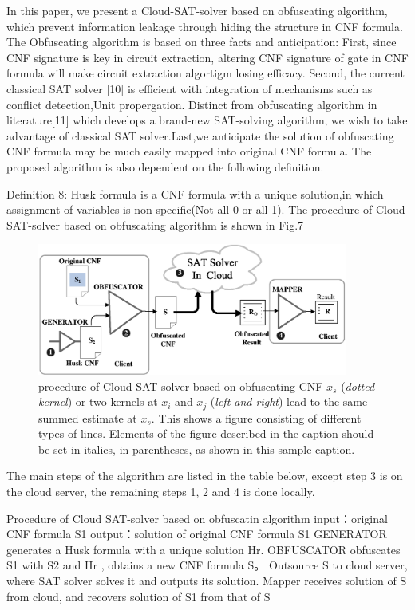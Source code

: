 \documentclass[runningheads,a4paper]{llncs}
\begin{document}
In this paper, we present a Cloud-SAT-solver based on obfuscating algorithm, which prevent information leakage through hiding the structure in CNF formula. The Obfuscating algorithm is based on three facts and anticipation: First, since CNF signature is key in circuit extraction, altering CNF signature of gate in CNF formula will make circuit extraction algortigm losing efficacy. Second, the current classical SAT solver [10] is efficient with integration of mechanisms such as conflict detection,Unit propergation. Distinct from obfuscating algorithm in literature[11] which develops a brand-new SAT-solving algorithm, we wish to take advantage of classical SAT solver.Last,we anticipate the solution of obfuscating CNF formula may be much easily mapped into original CNF formula.
\newline The proposed algorithm is also dependent on the following definition.

Definition 8: Husk formula is a CNF formula with a unique solution,in which assignment of variables is non-specific(Not all 0 or all 1).
\newline The procedure of Cloud SAT-solver based on obfuscating algorithm is shown in Fig.7
\begin{figure}
\centering
\includegraphics[width=10.2cm]{a5}
\caption{procedure of Cloud SAT-solver based on obfuscating CNF $x_s$ (\emph{dotted kernel}) or two kernels at
$x_i$ and $x_j$ (\textit{left and right}) lead to the same summed estimate
at $x_s$. This shows a figure consisting of different types of
lines. Elements of the figure described in the caption should be set in
italics, in parentheses, as shown in this sample caption.}
\label{fig:example}
\end{figure}

The main steps of the algorithm are listed in the table below, except step 3 is on the cloud server, the remaining steps 1, 2 and 4 is done locally.

Procedure of Cloud SAT-solver based on obfuscatin algorithm
\newline input：original CNF formula S1 
\newline output：solution of original CNF formula S1
 GENERATOR generates a Husk formula with a unique solution Hr.
 OBFUSCATOR obfuscates S1 with S2 and Hr , obtains a new CNF formula S。
 Outsource S to cloud server, where SAT solver solves it and outputs its solution. 
 Mapper receives solution of S from cloud, and recovers solution of S1 from that of S 
\end{document}
